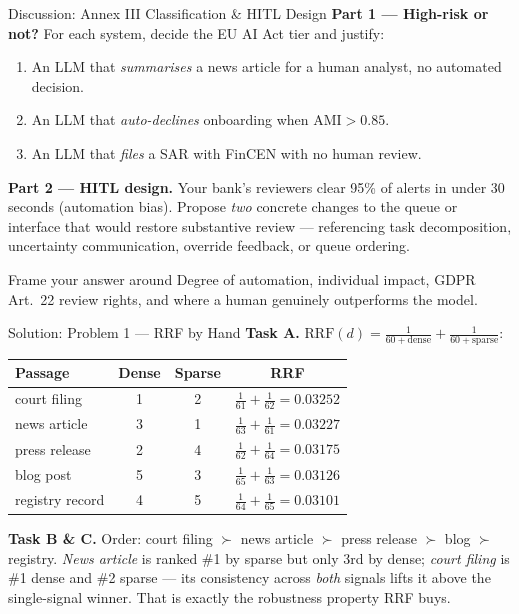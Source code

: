 \documentclass[9pt,t]{beamer}
\begin{document}
\begin{frame}{Discussion: Annex III Classification \& HITL Design}
\textbf{Part 1 --- High-risk or not?} For each system, decide the EU AI Act tier
and justify:
\begin{enumerate}\footnotesize
  \item An LLM that \emph{summarises} a news article for a human analyst, no
        automated decision.
  \item An LLM that \emph{auto-declines} onboarding when $\mathrm{AMI} > 0.85$.
  \item An LLM that \emph{files} a SAR with FinCEN with no human review.
\end{enumerate}

\medskip
\textbf{Part 2 --- HITL design.} Your bank's reviewers clear 95\% of alerts in
under 30 seconds (automation bias). Propose \emph{two} concrete changes to the
queue or interface that would restore substantive review --- referencing task
decomposition, uncertainty communication, override feedback, or queue ordering.

\medskip
\begin{block}{Frame your answer around}
Degree of automation, individual impact, GDPR Art.\ 22 review rights, and where a
human genuinely outperforms the model.
\end{block}
\end{frame}

\begin{frame}{Solution: Problem 1 --- RRF by Hand}
\textbf{Task A.} $\mathrm{RRF}(d) = \frac{1}{60+\text{dense}} + \frac{1}{60+\text{sparse}}$:

\medskip
\begin{tabular}{lccc}
\toprule
\textbf{Passage} & \textbf{Dense} & \textbf{Sparse} & \textbf{RRF} \\
\midrule
court filing    & 1 & 2 & $\tfrac{1}{61}+\tfrac{1}{62}=0.03252$ \\
news article    & 3 & 1 & $\tfrac{1}{63}+\tfrac{1}{61}=0.03227$ \\
press release   & 2 & 4 & $\tfrac{1}{62}+\tfrac{1}{64}=0.03175$ \\
blog post       & 5 & 3 & $\tfrac{1}{65}+\tfrac{1}{63}=0.03126$ \\
registry record & 4 & 5 & $\tfrac{1}{64}+\tfrac{1}{65}=0.03101$ \\
\bottomrule
\end{tabular}

\medskip
\textbf{Task B \& C.} Order: court filing $\succ$ news article $\succ$ press
release $\succ$ blog $\succ$ registry. \emph{News article} is ranked \#1 by sparse
but only 3rd by dense; \emph{court filing} is \#1 dense and \#2 sparse --- its
consistency across \emph{both} signals lifts it above the single-signal winner.
That is exactly the robustness property RRF buys.
\end{frame}
\end{document}
